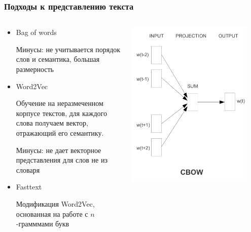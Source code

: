 \documentclass[10pt]{beamer}
\begin{document}
\begin{frame}
\frametitle{Подходы к представлению текста}

\begin{columns}
    \begin{column}{0.5\textwidth}
		\begin{itemize}
			\item
			Bag of words

			Минусы: не учитывается порядок слов и семантика, большая размерность

			\item
			Word2Vec
	
			Обучение на неразмеченном корпусе текстов, для каждого слова получаем вектор, отражающий его семантику.

			Минусы: не дает векторное представления для слов не из словаря

			\item
			Fasttext

			Модификация Word2Vec, основанная на работе с $n$-грамммами букв
		\end{itemize}
	\end{column}
    \begin{column}{0.5\textwidth}
        \begin{center}
            \includegraphics[width=0.9\textwidth]{images/cbow.png} 
        \end{center}
    \end{column}
\end{columns}

\end{frame}
\end{document}
